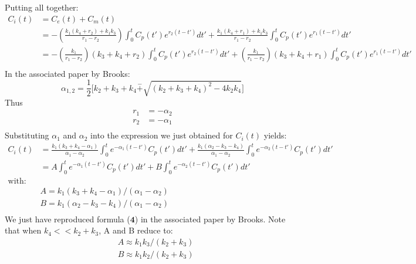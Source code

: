 \documentclass[12pt,twoside]{article}
\begin{document}
Putting all together:
\begin{align*}
	C_i(t)	&= C_e(t) + C_m(t) \\
			&= - ( \frac{ k_1 (k_4 + r_2)  + k_1 k_3  } { r_1 - r_2 } )  \int_0^t  C_p(t')  e^{r_2 (t-t')} dt'  + 
			\frac{ k_1 (k_4 + r_1)  + k_1 k_3  } { r_1 - r_2 } \int_0^t  C_p(t')  e^{r_1 (t-t')} dt' \\
			&= - (\frac{ k_1 } { r_1 - r_2 }) (k_3 + k_4 + r_2)  \int_0^t  C_p(t')  e^{r_2 (t-t')} dt'  + 
			 (\frac{ k_1 } { r_1 - r_2 }) (k_3 + k_4 + r_1)  \int_0^t  C_p(t')  e^{r_1 (t-t')} dt' \\
\end{align*}
 In the associated paper by Brooks:
\begin{equation*}
	\alpha_{1,2} = \frac{1}{2} \bigg [ k_2 + k_3 + k_4 \stackrel{-}{+} \sqrt{ (k_2 + k_3 + k_4)^2 - 4 k_2 k_4} \bigg ]
\end{equation*}
Thus
\begin{align*}
	r_1 &= - \alpha_2  \\
	r_2 &= - \alpha_1 \\
\end{align*}
Substituting $\alpha_1$ and $\alpha_2$ into the expression we just obtained for $C_i(t)$ yields:
\begin{align*}
C_i(t)	&= \frac{ k_1 (k_3 + k_4 - \alpha_1) } { \alpha_1 - \alpha_2 }  \int_0^t e^{-\alpha_1 (t-t')}  C_p(t')   dt'  + 
		\frac{ k_1  ( \alpha_2 - k_3 - k_4) } { \alpha_1 - \alpha_2 }  \int_0^t e^{-\alpha_2 (t-t')}  C_p(t')   dt'  \\
		&= A  \int_0^t e^{-\alpha_1 (t-t')}  C_p(t')   dt'  + B \int_0^t e^{-\alpha_2 (t-t')}  C_p(t')   dt'  \\
		\text{with:} \\
&		A =  k_1 (k_3 + k_4 - \alpha_1) / (\alpha_1 - \alpha_2 )\\
&		B =  k_1 ( \alpha_2 - k_3 - k_4) / (\alpha_1 - \alpha_2) \\
\end{align*}
 We just have reproduced formula ($\textbf{4}$) in the associated paper by Brooks. Note that when $k_4 << k_2+k_3$, A and B reduce to:
\begin{align*}
& A \approx k_1 k_3 / (k_2 + k_3) \\
& B \approx k_1 k_2 / (k_2 + k_3) \\
\end{align*}
\end{document}
